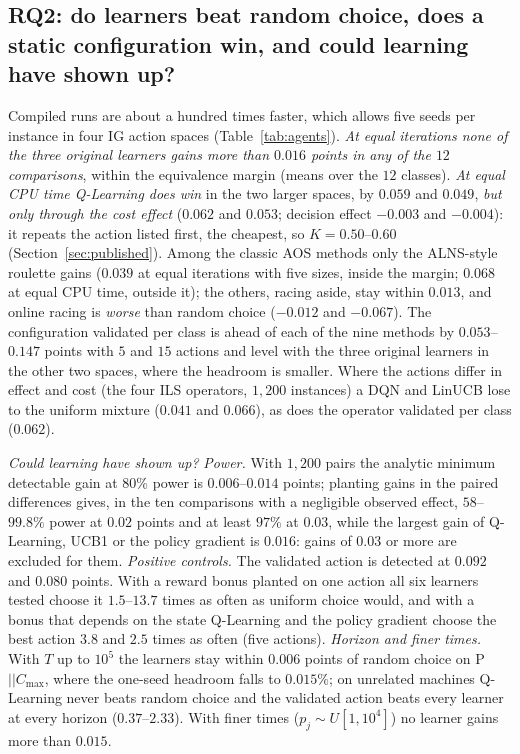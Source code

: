 \documentclass[conference,a4paper]{IEEEtran}
\newcommand{\Cmax}{C_{\max}}
\begin{document}
\subsection{RQ2: do learners beat random choice, does a static configuration win, and could learning have shown up?}
\label{sec:rq2}
Compiled runs are about a hundred times faster, which allows five seeds per instance in four IG action spaces (Table~\ref{tab:agents}).
\emph{At equal iterations none of the three original learners gains more than $0.016$ points in any of the $12$ comparisons}, within the equivalence margin (means over the $12$ classes).
\emph{At equal CPU time Q-Learning does win} in the two larger spaces, by $0.059$ and $0.049$, \emph{but only through the cost effect} ($0.062$ and $0.053$; decision effect $-0.003$ and $-0.004$): it repeats the action listed first, the cheapest, so $K=0.50$--$0.60$ (Section~\ref{sec:published}).
Among the classic AOS methods only the ALNS-style roulette gains ($0.039$ at equal iterations with five sizes, inside the margin; $0.068$ at equal CPU time, outside it); the others, racing aside, stay within $0.013$, and online racing is \emph{worse} than random choice ($-0.012$ and $-0.067$).
The configuration validated per class is ahead of each of the nine methods by $0.053$--$0.147$ points with $5$ and $15$ actions and level with the three original learners in the other two spaces, where the headroom is smaller.
Where the actions differ in effect and cost (the four ILS operators, $1{,}200$ instances) a DQN and LinUCB lose to the uniform mixture ($0.041$ and $0.066$), as does the operator validated per class ($0.062$).



\emph{Could learning have shown up?}\label{sec:longnote} \emph{Power.} With $1{,}200$ pairs the analytic minimum detectable gain at $80\%$ power is $0.006$--$0.014$ points; planting gains in the paired differences gives, in the ten comparisons with a negligible observed effect, $58$--$99.8\%$ power at $0.02$ points and at least $97\%$ at $0.03$, while the largest gain of Q-Learning, UCB1 or the policy gradient is $0.016$: gains of $0.03$ or more are excluded for them.
\emph{Positive controls.} The validated action is detected at $0.092$ and $0.080$ points. With a reward bonus planted on one action all six learners tested choose it $1.5$--$13.7$ times as often as uniform choice would, and with a bonus that depends on the state Q-Learning and the policy gradient choose the best action $3.8$ and $2.5$ times as often (five actions).
\emph{Horizon and finer times.} With $T$ up to $10^5$ the learners stay within $0.006$ points of random choice on P$||\Cmax$, where the one-seed headroom falls to $0.015\%$; on unrelated machines Q-Learning never beats random choice and the validated action beats every learner at every horizon ($0.37$--$2.33$). With finer times ($p_j\sim U[1,10^4]$) no learner gains more than $0.015$.
\end{document}
